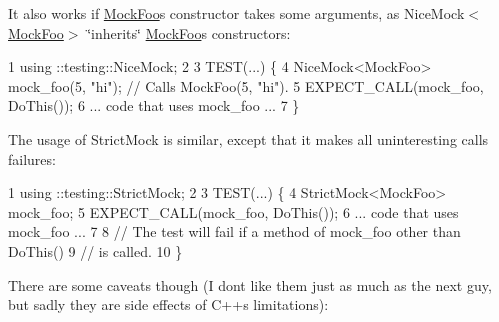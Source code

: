 It also works if {\ttfamily \hyperlink{classMockFoo}{Mock\+Foo}}\textquotesingle{}s constructor takes some arguments, as {\ttfamily Nice\+Mock$<$\hyperlink{classMockFoo}{Mock\+Foo}$>$} \char`\"{}inherits\char`\"{} {\ttfamily \hyperlink{classMockFoo}{Mock\+Foo}}\textquotesingle{}s constructors\+:


\begin{DoxyCode}
1 using ::testing::NiceMock;
2 
3 TEST(...) \{
4   NiceMock<MockFoo> mock\_foo(5, "hi");  // Calls MockFoo(5, "hi").
5   EXPECT\_CALL(mock\_foo, DoThis());
6   ... code that uses mock\_foo ...
7 \}
\end{DoxyCode}


The usage of {\ttfamily Strict\+Mock} is similar, except that it makes all uninteresting calls failures\+:


\begin{DoxyCode}
1 using ::testing::StrictMock;
2 
3 TEST(...) \{
4   StrictMock<MockFoo> mock\_foo;
5   EXPECT\_CALL(mock\_foo, DoThis());
6   ... code that uses mock\_foo ...
7 
8   // The test will fail if a method of mock\_foo other than DoThis()
9   // is called.
10 \}
\end{DoxyCode}


There are some caveats though (I don\textquotesingle{}t like them just as much as the next guy, but sadly they are side effects of C++\textquotesingle{}s limitations)\+:


